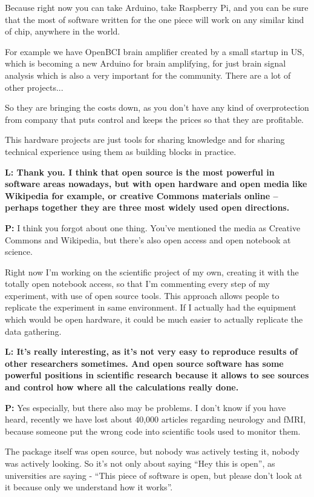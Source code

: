 \documentclass[10pt, a5paper]{article}
\begin{document}
\begin{Parallel}[p]{}{}
{Because right now you can take Arduino, take Raspberry Pi, and you can be sure that the most of software written for the one piece will work on any similar kind of chip, anywhere in the world. 

For example we have OpenBCI brain amplifier created by a small startup in US, which is becoming a new Arduino for brain amplifying, for just brain signal analysis which is also a very important for the community. There are a lot of other projects...

So they are bringing the costs down, as you don't have any kind of overprotection from company that puts control and keeps the prices  so that they are profitable. 

This hardware projects are just tools for sharing knowledge and for sharing technical experience using them as building blocks in practice.

{\noindent \bf L: Thank you. 
I think that open source is the most powerful in software areas nowadays, but with open hardware and open media like Wikipedia for example, or creative Commons materials online – perhaps together they are three most widely used open directions.}

{\noindent \bf P:} I think you forgot about one thing. You’ve mentioned the media as Creative Commons and Wikipedia, but there's also open access and open notebook at science. 

Right now I’m working on the scientific project of my own, creating it with the totally open notebook access, so that I’m commenting every step of my experiment, with use of open source tools. This approach allows people to replicate the experiment in same environment. If I actually had the equipment which would be open hardware, it could be much easier to actually replicate the data gathering.

{\noindent \bf L: It’s really interesting, as it’s not very easy to reproduce results of other researchers sometimes.
And open source software has some powerful positions in scientific research because it allows to see sources and control how where all the calculations really done. }

{\noindent \bf P:} Yes especially, but there also may be problems. I don't know if you have heard, recently we have lost about 40,000 articles regarding neurology and fMRI, because someone put the wrong code into scientific tools used to monitor them. 

The package itself was open source, but nobody was actively testing it, nobody was actively looking. So it's not only about saying “Hey this is open”, as universities are saying - “This piece of software is open, but please don't look at it because only we understand how it works”. 

}
\end{Parallel}
\end{document}
